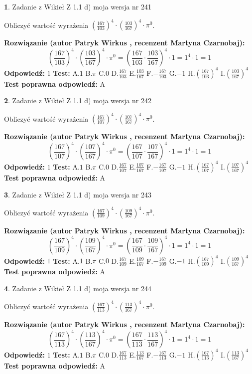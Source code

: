\documentclass[12pt, a4paper]{article}
\theoremstyle{definition} %
\newtheorem{zad}{}
\newcommand{\zadStart}[1]{\begin{zad}#1\newline}
\newcommand{\zadStop}{\end{zad}}
\newcommand{\rozwStart}[2]{\noindent \textbf{Rozwiązanie (autor #1 , recenzent #2): }\newline}
\newcommand{\rozwStop}{\newline}
\newcommand{\odpStart}{\noindent \textbf{Odpowiedź:}\newline}
\newcommand{\odpStop}{\newline}
\newcommand{\testStart}{\noindent \textbf{Test:}\newline}
\newcommand{\testStop}{\newline}
\newcommand{\kluczStart}{\noindent \textbf{Test poprawna odpowiedź:}\newline}
\newcommand{\kluczStop}{\newline}
\begin{document}
\zadStart{Zadanie z Wikieł Z 1.1 d) moja wersja nr 241}

Obliczyć wartość wyrażenia $(\frac{167}{103})^{4} \cdot (\frac{103}{167})^{4} \cdot \pi^{0}$.
\zadStop
\rozwStart{Patryk Wirkus}{Martyna Czarnobaj}
$$(\frac{167}{103})^{4} \cdot (\frac{103}{167})^{4} \cdot \pi^{0} = (\frac{167}{103} \cdot \frac{103}{167})^{4} \cdot 1 = 1^{4} \cdot 1 = 1$$
\rozwStop
\odpStart
$1$
\odpStop
\testStart
A.$1$ B.$\pi$ C.$0$ D.$\frac{167}{103}$ E.$\frac{103}{167}$
F.$-\frac{167}{103}$ G.$-1$
H.$(\frac{167}{103})^{4}$
I.$(\frac{103}{167})^{4}$
\testStop
\kluczStart
A
\kluczStop



\zadStart{Zadanie z Wikieł Z 1.1 d) moja wersja nr 242}

Obliczyć wartość wyrażenia $(\frac{167}{107})^{4} \cdot (\frac{107}{167})^{4} \cdot \pi^{0}$.
\zadStop
\rozwStart{Patryk Wirkus}{Martyna Czarnobaj}
$$(\frac{167}{107})^{4} \cdot (\frac{107}{167})^{4} \cdot \pi^{0} = (\frac{167}{107} \cdot \frac{107}{167})^{4} \cdot 1 = 1^{4} \cdot 1 = 1$$
\rozwStop
\odpStart
$1$
\odpStop
\testStart
A.$1$ B.$\pi$ C.$0$ D.$\frac{167}{107}$ E.$\frac{107}{167}$
F.$-\frac{167}{107}$ G.$-1$
H.$(\frac{167}{107})^{4}$
I.$(\frac{107}{167})^{4}$
\testStop
\kluczStart
A
\kluczStop



\zadStart{Zadanie z Wikieł Z 1.1 d) moja wersja nr 243}

Obliczyć wartość wyrażenia $(\frac{167}{109})^{4} \cdot (\frac{109}{167})^{4} \cdot \pi^{0}$.
\zadStop
\rozwStart{Patryk Wirkus}{Martyna Czarnobaj}
$$(\frac{167}{109})^{4} \cdot (\frac{109}{167})^{4} \cdot \pi^{0} = (\frac{167}{109} \cdot \frac{109}{167})^{4} \cdot 1 = 1^{4} \cdot 1 = 1$$
\rozwStop
\odpStart
$1$
\odpStop
\testStart
A.$1$ B.$\pi$ C.$0$ D.$\frac{167}{109}$ E.$\frac{109}{167}$
F.$-\frac{167}{109}$ G.$-1$
H.$(\frac{167}{109})^{4}$
I.$(\frac{109}{167})^{4}$
\testStop
\kluczStart
A
\kluczStop



\zadStart{Zadanie z Wikieł Z 1.1 d) moja wersja nr 244}

Obliczyć wartość wyrażenia $(\frac{167}{113})^{4} \cdot (\frac{113}{167})^{4} \cdot \pi^{0}$.
\zadStop
\rozwStart{Patryk Wirkus}{Martyna Czarnobaj}
$$(\frac{167}{113})^{4} \cdot (\frac{113}{167})^{4} \cdot \pi^{0} = (\frac{167}{113} \cdot \frac{113}{167})^{4} \cdot 1 = 1^{4} \cdot 1 = 1$$
\rozwStop
\odpStart
$1$
\odpStop
\testStart
A.$1$ B.$\pi$ C.$0$ D.$\frac{167}{113}$ E.$\frac{113}{167}$
F.$-\frac{167}{113}$ G.$-1$
H.$(\frac{167}{113})^{4}$
I.$(\frac{113}{167})^{4}$
\testStop
\kluczStart
A
\kluczStop
\end{document}
